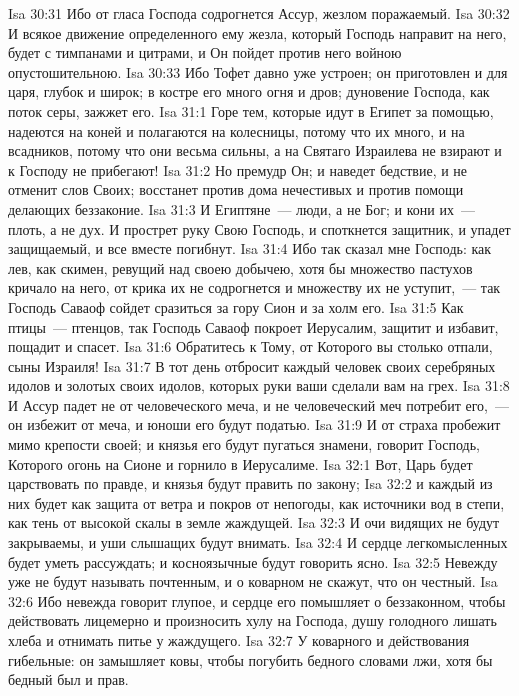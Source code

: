\vs Isa 30:31 Ибо от гласа Господа содрогнется Ассур, жезлом поражаемый.
\vs Isa 30:32 И всякое движение определенного ему жезла, который Господь направит на него, будет с тимпанами и цитрами, и Он пойдет против него войною опустошительною.
\vs Isa 30:33 Ибо Тофет давно уже устроен; он приготовлен и для царя, глубок и широк; в костре его много огня и дров; дуновение Господа, как поток серы, зажжет его.
\vs Isa 31:1 Горе тем, которые идут в Египет за помощью, надеются на коней и полагаются на колесницы, потому что их много, и на всадников, потому что они весьма сильны, а на Святаго Израилева не взирают и к Господу не прибегают!
\vs Isa 31:2 Но премудр Он; и наведет бедствие, и не отменит слов Своих; восстанет против дома нечестивых и против помощи делающих беззаконие.
\vs Isa 31:3 И Египтяне~--- люди, а не Бог; и кони их~--- плоть, а не дух. И прострет руку Свою Господь, и споткнется защитник, и упадет защищаемый, и все вместе погибнут.
\vs Isa 31:4 Ибо так сказал мне Господь: как лев, как скимен, ревущий над своею добычею, хотя бы множество пастухов кричало на него, от крика их не содрогнется и множеству их не уступит,~--- так Господь Саваоф сойдет сразиться за гору Сион и за холм его.
\vs Isa 31:5 Как птицы~--- птенцов, так Господь Саваоф покроет Иерусалим, защитит и избавит, пощадит и спасет.
\vs Isa 31:6 Обратитесь к Тому, от Которого вы столько отпали, сыны Израиля!
\vs Isa 31:7 В тот день отбросит каждый человек своих серебряных идолов и золотых своих идолов, которых руки ваши сделали вам на грех.
\vs Isa 31:8 И Ассур падет не от человеческого меча, и не человеческий меч потребит его,~--- он избежит от меча, и юноши его будут податью.
\vs Isa 31:9 И от страха пробежит мимо крепости своей; и князья его будут пугаться знамени, говорит Господь, Которого огонь на Сионе и горнило в Иерусалиме.
\vs Isa 32:1 Вот, Царь будет царствовать по правде, и князья будут править по закону;
\vs Isa 32:2 и каждый из них будет как защита от ветра и покров от непогоды, как источники вод в степи, как тень от высокой скалы в земле жаждущей.
\vs Isa 32:3 И очи видящих не будут закрываемы, и уши слышащих будут внимать.
\vs Isa 32:4 И сердце легкомысленных будет уметь рассуждать; и косноязычные будут говорить ясно.
\vs Isa 32:5 Невежду уже не будут называть почтенным, и о коварном не скажут, что он честный.
\vs Isa 32:6 Ибо невежда говорит глупое, и сердце его помышляет о беззаконном, чтобы действовать лицемерно и произносить хулу на Господа, душу голодного лишать хлеба и отнимать питье у жаждущего.
\vs Isa 32:7 У коварного и действования гибельные: он замышляет ковы, чтобы погубить бедного словами лжи, хотя бы бедный был и прав.
